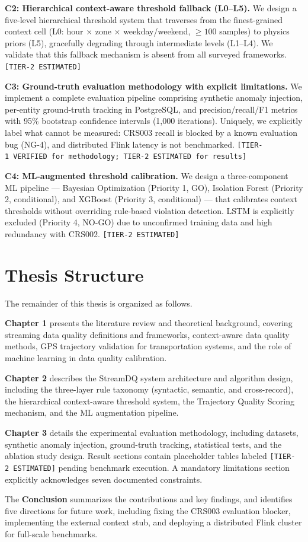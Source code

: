 \textbf{C2: Hierarchical context-aware threshold fallback (L0--L5).} We design
a five-level hierarchical threshold system that traverses from the finest-grained
context cell (L0: hour $\times$ zone $\times$ weekday/weekend, $\geq 100$
samples) to physics priors (L5), gracefully degrading through intermediate levels
(L1--L4). We validate that this fallback mechanism is absent from all
surveyed frameworks.
\texttt{[TIER-2\ ESTIMATED]}

\textbf{C3: Ground-truth evaluation methodology with explicit limitations.}
We implement a complete evaluation pipeline comprising synthetic anomaly injection,
per-entity ground-truth tracking in PostgreSQL, and precision/recall/F1 metrics
with 95\% bootstrap confidence intervals (1,000 iterations). Uniquely, we
explicitly label what cannot be measured: CRS003 recall is blocked by a known
evaluation bug (NG-4), and distributed Flink latency is not benchmarked.
\texttt{[TIER-1\ VERIFIED\ for\ methodology;\ TIER-2\ ESTIMATED\ for\ results]}

\textbf{C4: ML-augmented threshold calibration.} We design a three-component
ML pipeline — Bayesian Optimization (Priority 1, GO), Isolation Forest (Priority 2,
conditional), and XGBoost (Priority 3, conditional) — that calibrates context
thresholds without overriding rule-based violation detection. LSTM is explicitly
excluded (Priority 4, NO-GO) due to unconfirmed training data and high
redundancy with CRS002.
\texttt{[TIER-2\ ESTIMATED]}

\section{Thesis Structure}
\label{sec:intro-structure}

The remainder of this thesis is organized as follows.

\textbf{Chapter 1} presents the literature review and theoretical background,
covering streaming data quality definitions and frameworks, context-aware data
quality methods, GPS trajectory validation for transportation systems, and the
role of machine learning in data quality calibration.

\textbf{Chapter 2} describes the StreamDQ system architecture and algorithm
design, including the three-layer rule taxonomy (syntactic, semantic, and
cross-record), the hierarchical context-aware threshold system, the Trajectory
Quality Scoring mechanism, and the ML augmentation pipeline.

\textbf{Chapter 3} details the experimental evaluation methodology, including
datasets, synthetic anomaly injection, ground-truth tracking, statistical tests,
and the ablation study design. Result sections contain placeholder tables
labeled \texttt{[TIER-2\ ESTIMATED]} pending benchmark execution. A mandatory
limitations section explicitly acknowledges seven documented constraints.

The \textbf{Conclusion} summarizes the contributions and key findings, and
identifies five directions for future work, including fixing the CRS003
evaluation blocker, implementing the external context stub, and deploying a
distributed Flink cluster for full-scale benchmarks.
